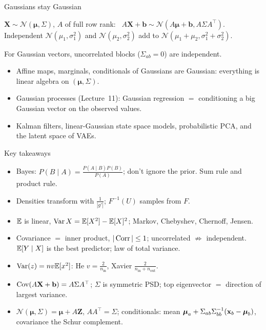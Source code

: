 \documentclass[aspectratio=1610,11pt]{beamer}
\begin{document}
\begin{frame}{Gaussians stay Gaussian}
    \begin{corollary}
        \small $\mathbf{X} \sim \mathcal{N}(\boldsymbol{\mu}, \Sigma)$, $A$ of full row rank: \ $A\mathbf{X} + \mathbf{b} \sim \mathcal{N}(A\boldsymbol{\mu} + \mathbf{b}, A\Sigma A^\top)$. Independent $\mathcal{N}(\mu_1, \sigma_1^2)$ and $\mathcal{N}(\mu_2, \sigma_2^2)$ add to $\mathcal{N}(\mu_1 + \mu_2, \sigma_1^2 + \sigma_2^2)$.
    \end{corollary}
    \begin{theorem}
        \small For Gaussian vectors, uncorrelated blocks ($\Sigma_{ab} = 0$) are independent.
    \end{theorem}
    \small
    \begin{mlbox}
        \small
        \begin{itemize}
            \item Affine maps, marginals, conditionals of Gaussians are Gaussian: everything is linear algebra on $(\boldsymbol{\mu}, \Sigma)$.
            \item Gaussian processes (Lecture~11): Gaussian regression $=$ conditioning a big Gaussian vector on the observed values.
            \item Kalman filters, linear-Gaussian state space models, probabilistic PCA, and the latent space of VAEs.
        \end{itemize}
    \end{mlbox}
\end{frame}

\begin{frame}{Key takeaways}
    \small
    \begin{itemize}
        \item Bayes: $P(B \mid A) = \frac{P(A \mid B)P(B)}{P(A)}$; don't ignore the prior. Sum rule and product rule.
        \item Densities transform with $\frac{1}{|g'|}$; $F^{-1}(U)$ samples from $F$.
        \item $\mathbb{E}$ is linear, $\operatorname{Var} X = \mathbb{E}[X^2] - \mathbb{E}[X]^2$; Markov, Chebyshev, Chernoff, Jensen.
        \item Covariance $=$ inner product, $|\operatorname{Corr}| \leq 1$; uncorrelated $\not\Rightarrow$ independent. $\mathbb{E}[Y \mid X]$ is the best predictor; law of total variance.
        \item $\operatorname{Var}(z) = nv\mathbb{E}[x^2]$: He $v = \frac{2}{n_{\text{in}}}$, Xavier $\frac{2}{n_{\text{in}} + n_{\text{out}}}$.
        \item $\operatorname{Cov}(A\mathbf{X} + \mathbf{b}) = A\Sigma A^\top$; $\Sigma$ is symmetric PSD; top eigenvector $=$ direction of largest variance.
        \item $\mathcal{N}(\boldsymbol{\mu}, \Sigma) = \boldsymbol{\mu} + A\mathbf{Z}$, $AA^\top = \Sigma$; conditionals: mean $\boldsymbol{\mu}_a + \Sigma_{ab}\Sigma_{bb}^{-1}(\mathbf{x}_b - \boldsymbol{\mu}_b)$, covariance the Schur complement.
    \end{itemize}
\end{frame}
\end{document}
